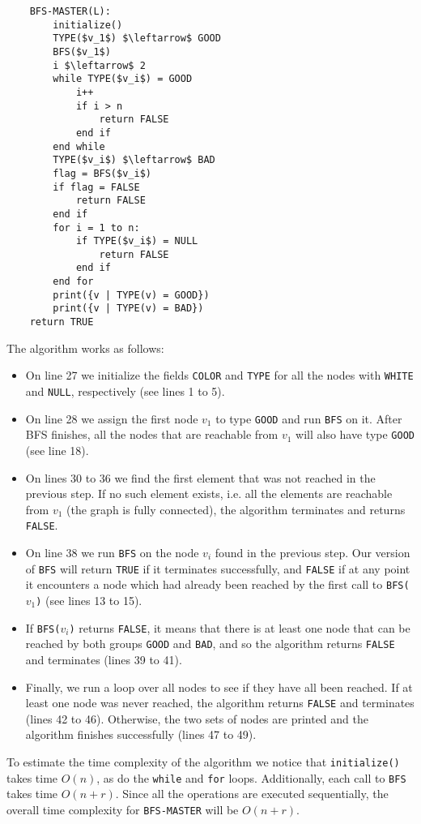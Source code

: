 \documentclass{article}
\begin{document}
\begin{enumerate}[1.]
\begin{lstlisting}
    BFS-MASTER(L):
        initialize()
        TYPE($v_1$) $\leftarrow$ GOOD
        BFS($v_1$)
        i $\leftarrow$ 2
        while TYPE($v_i$) = GOOD
            i++
            if i > n
                return FALSE
            end if
        end while
        TYPE($v_i$) $\leftarrow$ BAD
        flag = BFS($v_i$)
        if flag = FALSE
            return FALSE
        end if
        for i = 1 to n:
            if TYPE($v_i$) = NULL
                return FALSE
            end if
        end for
        print({v | TYPE(v) = GOOD})
        print({v | TYPE(v) = BAD})
    return TRUE
\end{lstlisting}

    The algorithm works as follows:
    \begin{itemize}
        \item On line 27 we initialize the fields \texttt{COLOR} and \texttt{TYPE} for all the nodes with \texttt{WHITE} and \texttt{NULL}, respectively (see lines 1 to 5).
        \item On line 28 we assign the first node $v_1$ to type \texttt{GOOD} and run \texttt{BFS} on it. After BFS finishes, all the nodes that are reachable from $v_1$ will also have type \texttt{GOOD} (see line 18).
        \item On lines 30 to 36 we find the first element that was not reached in the previous step. If no such element exists, i.e. all the elements are reachable from $v_1$ (the graph is fully connected), the algorithm terminates and returns \texttt{FALSE}.
        \item On line 38 we run \texttt{BFS} on the node $v_i$ found in the previous step. Our version of \texttt{BFS} will return \texttt{TRUE} if it terminates successfully, and \texttt{FALSE} if at any point it encounters a node which had already been reached by the first call to \texttt{BFS($v_1$)} (see lines 13 to 15).
        \item If \texttt{BFS($v_i$)} returns \texttt{FALSE}, it means that there is at least one node that can be reached by both groups \texttt{GOOD} and \texttt{BAD}, and so the algorithm returns \texttt{FALSE} and terminates (lines 39 to 41).
        \item Finally, we run a loop over all nodes to see if they have all been reached. If at least one node was never reached, the algorithm returns \texttt{FALSE} and terminates (lines 42 to 46). Otherwise, the two sets of nodes are printed and the algorithm finishes successfully (lines 47 to 49).
    \end{itemize}
    To estimate the time complexity of the algorithm we notice that \texttt{initialize()} takes time $O(n)$, as do the \texttt{while} and \texttt{for} loops. Additionally, each call to \texttt{BFS} takes time $O(n+r)$. Since all the operations are executed sequentially, the overall time complexity for \texttt{BFS-MASTER} will be $O(n+r)$.
    

\end{enumerate}
\end{document}
